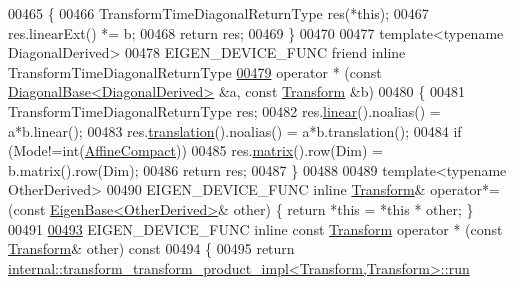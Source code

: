 \begin{DoxyCode}
00465 \textcolor{keyword}{  }\{
00466     TransformTimeDiagonalReturnType res(*\textcolor{keyword}{this});
00467     res.linearExt() *= b;
00468     \textcolor{keywordflow}{return} res;
00469   \}
00470 
00477   \textcolor{keyword}{template}<\textcolor{keyword}{typename} DiagonalDerived>
00478   EIGEN\_DEVICE\_FUNC \textcolor{keyword}{friend} \textcolor{keyword}{inline} TransformTimeDiagonalReturnType
\hyperlink{group___geometry___module_a1ee8a506136a4ac8084b2913cc249ec8}{00479}     operator * (\textcolor{keyword}{const} \hyperlink{class_eigen_1_1_diagonal_base}{DiagonalBase<DiagonalDerived>} &a, \textcolor{keyword}{const} 
      \hyperlink{group___geometry___module_class_eigen_1_1_transform}{Transform} &b)
00480   \{
00481     TransformTimeDiagonalReturnType res;
00482     res.\hyperlink{group___geometry___module_a535bd63d047c2a36585c3f9b62219a1e}{linear}().noalias() = a*b.linear();
00483     res.\hyperlink{group___geometry___module_afa93ba97d26912bb3d8777cbed102045}{translation}().noalias() = a*b.translation();
00484     \textcolor{keywordflow}{if} (Mode!=\textcolor{keywordtype}{int}(\hyperlink{group__enums_ggaee59a86102f150923b0cac6d4ff05107aa30a06b60d218b709020972df47de2b0}{AffineCompact}))
00485       res.\hyperlink{group___geometry___module_aec8168000a88a807130d41020af98d47}{matrix}().row(Dim) = b.matrix().row(Dim);
00486     \textcolor{keywordflow}{return} res;
00487   \}
00488 
00489   \textcolor{keyword}{template}<\textcolor{keyword}{typename} OtherDerived>
00490   EIGEN\_DEVICE\_FUNC \textcolor{keyword}{inline} \hyperlink{group___geometry___module_class_eigen_1_1_transform}{Transform}& operator*=(\textcolor{keyword}{const} 
      \hyperlink{group___core___module_struct_eigen_1_1_eigen_base}{EigenBase<OtherDerived>}& other) \{ \textcolor{keywordflow}{return} *\textcolor{keyword}{this} = *\textcolor{keyword}{this} * other; \}
00491 
\hyperlink{group___geometry___module_a5c6f7fee617deca6f2a9052fadbe81e5}{00493}   EIGEN\_DEVICE\_FUNC \textcolor{keyword}{inline} \textcolor{keyword}{const} \hyperlink{group___geometry___module_class_eigen_1_1_transform}{Transform} operator * (\textcolor{keyword}{const} \hyperlink{group___geometry___module_class_eigen_1_1_transform}{Transform}& other)\textcolor{keyword}{ const}
00494 \textcolor{keyword}{  }\{
00495     \textcolor{keywordflow}{return} \hyperlink{struct_eigen_1_1internal_1_1transform__transform__product__impl}{internal::transform\_transform\_product\_impl<Transform,Transform>::run}

\end{DoxyCode}
